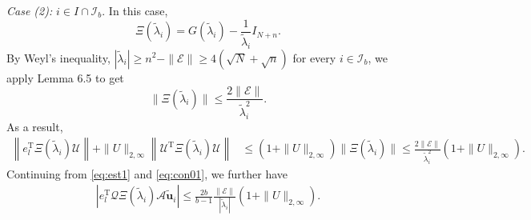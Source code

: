 \documentclass[reqno]{amsart}
\newcommand{\T}{\mathrm{T}}
\theoremstyle{plain}
\theoremstyle{definition}
\begin{document}

\medskip

\noindent\emph{Case (2):} $i \in I \cap \mathcal I_b$. In this case,  $$\Xi(\widetilde \lambda_i)=G(\widetilde \lambda_i)-\frac{1}{\widetilde \lambda_i} I_{N+n}.$$
By Weyl's inequality, $|\widetilde \lambda_i| \ge n^2 - \|\mathcal E\| \ge 4(\sqrt N + \sqrt n)$ for every $i \in \mathcal I_b$, we apply Lemma 6.5 to get
\begin{equation*}
\|\Xi(\widetilde{\lambda}_i) \| \le \frac{2\|\mathcal E\|}{\widetilde{\lambda}_i^2}. %
\end{equation*}
As a result,
\begin{align*}
\left\|e_l^\T  \Xi(\widetilde \lambda_i) \mathcal U \right\| + \|  U \|_{2,\infty} \left\|\mathcal U^\T \Xi(\widetilde \lambda_i) \mathcal U \right\| 
&\le (1+ \|  U \|_{2,\infty}) \|\Xi(\widetilde{\lambda}_i) \| \le \frac{2\|\mathcal E\| }{\widetilde{\lambda}_i^2}(1+ \|  U \|_{2,\infty}).
\end{align*}
Continuing from \eqref{eq:est1} and \eqref{eq:con01}, we further have
\begin{align}\label{eq:est21}
\left| e_l^\T \mathcal Q \Xi(\widetilde \lambda_i) \mathcal A \widetilde{\mathbf u}_i \right| \le \frac{2b}{b-1}\frac{\|\mathcal E\| }{|\widetilde{\lambda}_i|}(1+ \|  U \|_{2,\infty}).
\end{align}
\end{document}
